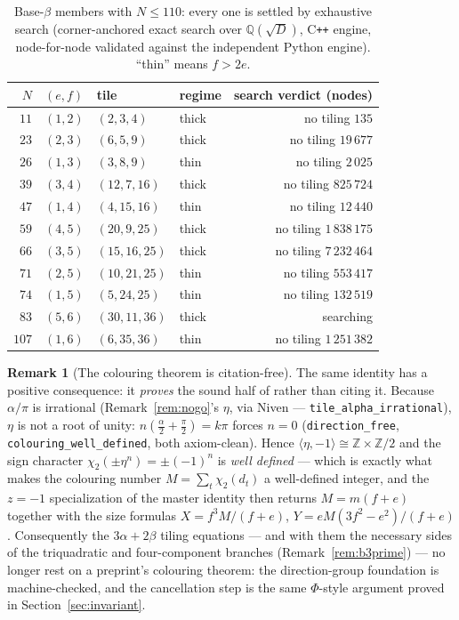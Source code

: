 \documentclass[11pt,reqno]{amsart}
\theoremstyle{plain}
\theoremstyle{definition}
\newtheorem{remark}[theorem]{Remark}
\newcommand{\Z}{\mathbb{Z}}
\begin{document}
\begin{table}[h]\centering
\caption{Base-$\beta$ members with $N\le110$: every one is settled by exhaustive search
(corner-anchored exact search over $\mathbb{Q}(\sqrt{D})$, C\texttt{++} engine, node-for-node
validated against the independent Python engine). ``thin'' means $f>2e$.}\label{tab:basebeta}
\begin{tabular}{rlllr}
\hline
$N$ & $(e,f)$ & tile & regime & search verdict (nodes)\\
\hline
$11$  & $(1,2)$ & $(2,3,4)$    & thick & no tiling \hfill $135$\\
$23$  & $(2,3)$ & $(6,5,9)$    & thick & no tiling \hfill $19\,677$\\
$26$  & $(1,3)$ & $(3,8,9)$    & thin  & no tiling \hfill $2\,025$\\
$39$  & $(3,4)$ & $(12,7,16)$  & thick & no tiling \hfill $825\,724$\\
$47$  & $(1,4)$ & $(4,15,16)$  & thin  & no tiling \hfill $12\,440$\\
$59$  & $(4,5)$ & $(20,9,25)$  & thick & no tiling \hfill $1\,838\,175$\\
$66$  & $(3,5)$ & $(15,16,25)$ & thick & no tiling \hfill $7\,232\,464$\\
$71$  & $(2,5)$ & $(10,21,25)$ & thin  & no tiling \hfill $553\,417$\\
$74$  & $(1,5)$ & $(5,24,25)$  & thin  & no tiling \hfill $132\,519$\\
$83$  & $(5,6)$ & $(30,11,36)$ & thick & searching\\
$107$ & $(1,6)$ & $(6,35,36)$  & thin  & no tiling \hfill $1\,251\,382$\\
\hline
\end{tabular}
\end{table}

\begin{remark}[The colouring theorem is citation-free]\label{rem:colouring}
The same identity has a positive consequence: it \emph{proves} the sound half of
\cite[Thm.~14]{BeesonIII} rather than citing it. Because $\alpha/\pi$ is irrational
(Remark~\ref{rem:nogo}'s $\eta$, via Niven --- \texttt{tile\_alpha\_irrational}), $\eta$ is not a
root of unity: $n(\tfrac\alpha2+\tfrac\pi2)=k\pi$ forces $n=0$
(\texttt{direction\_free}, \texttt{colouring\_well\_defined}, both axiom-clean). Hence
$\langle\eta,-1\rangle\cong\Z\times\Z/2$ and the sign character $\chi_2(\pm\eta^n)=\pm(-1)^n$ is
\emph{well defined} --- which is exactly what makes the colouring number
$M=\sum_t\chi_2(d_t)$ a well-defined integer, and the $z=-1$ specialization of the master identity
then returns $M=m(f+e)$ together with the size formulas $X=f^3M/(f+e)$, $Y=eM(3f^2-e^2)/(f+e)$.
Consequently the $3\alpha+2\beta$ tiling equations --- and with them the necessary sides of the
triquadratic and four-component branches (Remark~\ref{rem:b3prime}) --- no longer rest on a
preprint's colouring theorem: the direction-group foundation is machine-checked, and the
cancellation step is the same $\Phi$-style argument proved in Section~\ref{sec:invariant}.
\end{remark}
\end{document}
